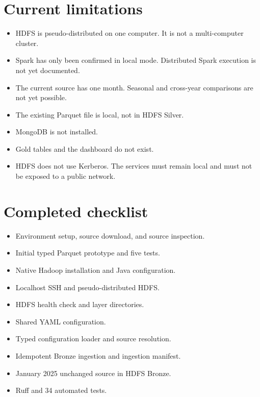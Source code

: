 \documentclass[11pt,a4paper]{article}
\begin{document}
\section{Current limitations}

\begin{itemize}[leftmargin=*]
  \item HDFS is pseudo-distributed on one computer. It is not a multi-computer cluster.
  \item Spark has only been confirmed in local mode. Distributed Spark execution is not yet documented.
  \item The current source has one month. Seasonal and cross-year comparisons are not yet possible.
  \item The existing Parquet file is local, not in HDFS Silver.
  \item MongoDB is not installed.
  \item Gold tables and the dashboard do not exist.
  \item HDFS does not use Kerberos. The services must remain local and must not be exposed to a public network.
\end{itemize}

\section{Completed checklist}

\begin{itemize}[leftmargin=*]
  \item[Complete:] Environment setup, source download, and source inspection.
  \item[Complete:] Initial typed Parquet prototype and five tests.
  \item[Complete:] Native Hadoop installation and Java configuration.
  \item[Complete:] Localhost SSH and pseudo-distributed HDFS.
  \item[Complete:] HDFS health check and layer directories.
  \item[Complete:] Shared YAML configuration.
  \item[Complete:] Typed configuration loader and source resolution.
  \item[Complete:] Idempotent Bronze ingestion and ingestion manifest.
  \item[Complete:] January 2025 unchanged source in HDFS Bronze.
  \item[Complete:] Ruff and 34 automated tests.
\end{itemize}
\end{document}
